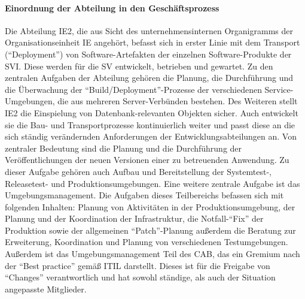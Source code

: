 \paragraph{Einordnung der Abteilung in den Geschäftsprozess}
Die Abteilung \ac{IE2}, die aus Sicht des unternehmensinternen Organigramms der Organisationseinheit \ac{IE} angehört, befasst sich in erster Linie mit dem Transport (\enquote{Deployment}) von Software-Artefakten der einzelnen Software-Produkte der \ac{SVI}. Diese werden für die \ac{SV} entwickelt, betrieben und gewartet. Zu den zentralen Aufgaben der Abteilung gehören die Planung, die Durchführung und die Überwachung der \enquote{Build/Deployment}-Prozesse der verschiedenen Service-Umgebungen, die aus mehreren Server-Verbünden bestehen. Des Weiteren stellt \ac{IE2} die Einspielung von Datenbank-relevanten Objekten sicher. Auch entwickelt sie die Bau- und Transportprozesse kontinuierlich weiter und passt diese an die sich ständig verändernden Anforderungen der Entwicklungsabteilungen an. Von zentraler Bedeutung sind die Planung und die Durchführung der Veröffentlichungen der neuen Versionen einer zu betreuenden Anwendung. Zu dieser Aufgabe gehören auch Aufbau und Bereitstellung der Systemtest-, Releasetest- und Produktionsumgebungen. Eine weitere zentrale Aufgabe ist das Umgebungsmanagement. Die Aufgaben dieses Teilbereichs befassen sich mit folgenden Inhalten: Planung von Aktivitäten in der Produktionsumgebung, der Planung und der Koordination der Infrastruktur, die Notfall-\enquote{Fix} der Produktion sowie der allgemeinen \enquote{Patch}-Planung außerdem die Beratung zur Erweiterung, Koordination und Planung von verschiedenen Testumgebungen. Außerdem ist das Umgebungsmanagement Teil des \ac{CAB}, das ein Gremium nach der \enquote{Best practice} gemäß \ac{ITIL} darstellt. Dieses ist für die Freigabe von \enquote{Changes} verantwortlich und hat sowohl ständige, als auch der Situation angepasste Mitglieder. 

